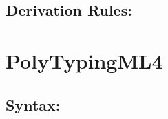 \documentclass[11pt]{jarticle}
\begin{document}

\subsection*{Derivation Rules:}
\TypingMLivDisplayRules

\newpage

\section*{PolyTypingML4}



\subsection*{Syntax:}
\end{document}
